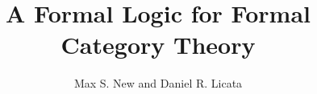 \documentclass{llncs}
\begin{document}
\newcommand{\paramPresheaf}[1]{\mathcal P^{#1}}
\newcommand{\pmPresheaf}{\paramPresheaf\pm}
\newcommand{\posPresheaf}{\paramPresheaf+}
\newcommand{\negPresheaf}{\paramPresheaf-}
\newcommand{\negPresheafAppPtoX}[2]{#2\in #1}
\newcommand{\posPresheafAppPtoX}[2]{#1 \ni #2}
\newcommand{\negPresheafApp}{\negPresheafAppPtoX}
\newcommand{\posPresheafApp}{\posPresheafAppPtoX}

\newcommand{\graphProf}[3]{\sum_{{#1};{#2}} #3}

\newcommand{\algCtx}{\textrm{Ctx}}
\newcommand{\algSubst}{\textrm{Subst}}
\newcommand{\algTy}{\textrm{Type}}
\newcommand{\algTm}{\textrm{Term}}
\newcommand{\algCat}{\textrm{Cat}}
\newcommand{\algVarr}{\textrm{Functor}}
\newcommand{\algHCtx}{\textrm{ProfCtx}}
\newcommand{\algHSubst}{\textrm{ProfSubst}}
\newcommand{\algHarr}{\textrm{Prof}}
\newcommand{\algTrans}{\textrm{Trans}}
\newcommand{\algElts}{\textrm{Elts}}
\newcommand{\algEltsI}{\textrm{EltsI}}

\newcommand{\algLHom}{\textrm{LHom}}
\newcommand{\algLHomI}{\textrm{LHomI}}
\newcommand{\algLHomE}{\textrm{LHomE}}
\newcommand{\algRHom}{\textrm{RHom}}
\newcommand{\algRHomI}{\textrm{RHomI}}
\newcommand{\algRHomE}{\textrm{RHomE}}

\newcommand{\algUnit}{\textrm{Unit}}
\newcommand{\algUnitI}{\textrm{UnitI}}
\newcommand{\algUnitE}{\textrm{UnitE}}

\newcommand{\algTensor}{\textrm{Tensor}}
\newcommand{\algTensorI}{\textrm{TensorI}}
\newcommand{\algTensorE}{\textrm{TensorE}}

\newcommand{\algCatTy}{\textrm{Cat}}
\newcommand{\algCatQt}{\textrm{CatQt}}
\newcommand{\algCatUnqt}{\textrm{CatUnQt}}

\newcommand{\algTransTy}{\textrm{Trans}}
\newcommand{\algTransQt}{\textrm{TransQt}}
\newcommand{\algTransUnqt}{\textrm{TransUnQt}}

\newcommand{\algVarrQt}{\textrm{FunctQt}}
\newcommand{\algVarrUnqt}{\textrm{FunctUnQt}}

\newcommand{\quoth}[1]{\lceil{} {#1}\rceil{}}
\newcommand{\unquoth}[1]{\lfloor{} {#1}\rfloor{}}

\newcommand{\citet}[1]{\cite{#1}}
\newcommand{\citep}[1]{(\cite{#1})}

\title{A Formal Logic for Formal Category Theory}
\author{Max S. New and Daniel R. Licata}

\maketitle
\end{document}
